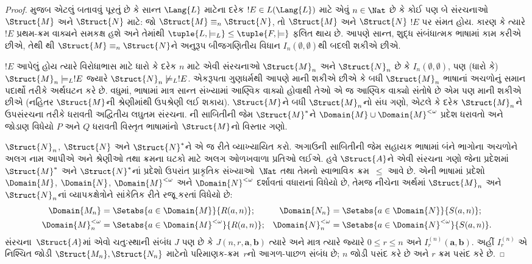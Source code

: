 \begin{proof}
 મુજબ એટલું બતાવવું પૂરતું છે કે સાન્ત
$\Lang{L}$ માટેના દરેક $!E \in L(\Lang{L})$ માટે એવું $n \in \Nat$
છે કે કોઈ પણ બે સંરચનાઓ $\Struct{M}$ અને $\Struct{N}$ માટે: જો
$\Struct{M} \equiv_n \Struct{N}$, તો $\Struct{M}$ અને $\Struct{N}$
$!E$ પર સંમત હોય. કારણ કે ત્યારે $!E$ પ્રથમ-ક્રમ વાક્યને સમકક્ષ
હશે અને તેમાંથી $\tuple{L, \models_L} \le \tuple{F, \models}$
ફલિત થાય છે. આપણે સાન્ત, શુદ્ધ સંબંધાત્મક ભાષામાં કામ કરીએ
છીએ, તેથી થી $\Struct{M} \equiv_n
\Struct{N}$ને અનુરૂપ બીજગણિતીય વિધાન $I_n(\emptyset,\emptyset)$થી
બદલી શકીએ છીએ.

$!E$ આપેલું હોય ત્યારે વિરોધાભાસ માટે ધારો કે દરેક $n$ માટે એવી
સંરચનાઓ $\Struct{M}_n$ અને $\Struct{N}_n$ છે કે
$I_n(\emptyset, \emptyset)$, પણ (ધારો કે) $\Struct{M}_n \models_L !E$
જ્યારે $\Struct{N}_n \not\models_L !E$. એકરૂપતા ગુણધર્મથી આપણે માની
શકીએ છીએ કે બધી $\Struct{M}_n$ ભાષાનાં અચળોનું સમાન પદાર્થો તરીકે
અર્થઘટન કરે છે. વધુમાં, ભાષામાં માત્ર સાન્ત સંખ્યામાં આણ્વિક
વાક્યો હોવાથી તેઓ એ જ આણ્વિક વાક્યો સંતોષે છે એમ પણ
માની શકીએ છીએ (નહિતર $\Struct{M}$ની શ્રેણીમાંથી ઉપશ્રેણી લઈ શકાય).
$\Struct{M}$ને બધી $\Struct{M}_n$નો સંઘ ગણો, એટલે કે દરેક
$\Struct{M}_n$ને ઉપસંરચના તરીકે ધરાવતી અદ્વિતીય લઘુતમ સંરચના.
ની સાબિતીની જેમ $\Struct{M}^*$ને
$\Domain{M} \cup \Domain{M}^{<\omega}$ પ્રદેશ ધરાવતો અને જોડાણ
વિધેયો $P$ અને $Q$ ધરાવતી વિસ્તૃત ભાષામાંનો
$\Struct{M}$નો વિસ્તાર ગણો.

$\Struct{N}_n$, $\Struct{N}$ અને $\Struct{N}^*$ને એ જ રીતે વ્યાખ્યાયિત
કરો. અગાઉની સાબિતીની જેમ સહાયક ભાષામાં બંને ભાગોના અચળોને અલગ નામ
આપીએ અને શ્રેણીઓ તથા ક્રમના ઘટકો માટે અલગ ઓળખવાળા પ્રતિઓ લઈએ.
હવે $\Struct{A}$ને એવી સંરચના ગણો જેના પ્રદેશમાં
$\Struct{M}^*$ અને $\Struct{N}^*$નાં પ્રદેશો ઉપરાંત પ્રાકૃતિક
સંખ્યાઓ~$\Nat$ તથા તેમનો સ્વાભાવિક ક્રમ~$\le$ આવે છે. એની
ભાષામાં પ્રદેશો $\Domain{M}$, $\Domain{N}$,
$\Domain{M}^{<\omega}$ અને $\Domain{N}^{<\omega}$ દર્શાવતાં વધારાનાં
વિધેયો છે, તેમજ નીચેના અર્થમાં $\Struct{M}_n$ અને
$\Struct{N}_n$નાં વ્યાપકક્ષેત્રોને સાંકેતિક રીતે રજૂ કરતાં
વિધેયો છે:
\begin{align*}
  \Domain{M_n} & = \Setabs{a \in \Domain{M}}{R(a, n)}; &
  \Domain{N_n} & = \Setabs{a \in \Domain{N}}{S(a,n)}; \\
  \Domain{M}^{<\omega}_n & = \Setabs{a \in \Domain{M}^{<\omega}}{R(a,n)}; &
  \Domain{N}^{<\omega}_n & = \Setabs{a \in \Domain{N}^{<\omega}}{S(a,n)}.
\end{align*}
સંરચના~$\Struct{A}$માં એવો ચતુઃસ્થાની સંબંધ $J$ પણ છે કે
$J(n,r,\mathbf{a},\mathbf{b})$ ત્યારે અને માત્ર ત્યારે જ્યારે
$0\le r\le n$ અને $I_r^{(n)}(\mathbf{a},\mathbf{b})$.
અહીં $I_r^{(n)}$ એ નિશ્ચિત જોડી $\Struct{M_n},\Struct{N_n}$ માટેનો
પરિમાણક-ક્રમ~$r$નો આગળ-પાછળ સંબંધ છે; $n$ જોડી પસંદ કરે છે અને $r$
ક્રમ પસંદ કરે છે.


\end{proof}
